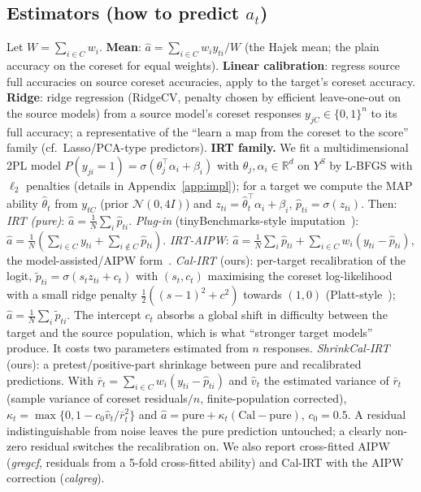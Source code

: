 \subsection{Estimators (how to predict $a_t$)}
Let $W=\sum_{i\in C}w_i$.
\textbf{Mean}: $\hat a=\sum_{i\in C}w_iy_{ti}/W$ (the Hajek mean; the plain accuracy on the coreset for equal weights).
\textbf{Linear calibration}: regress source full accuracies on source coreset accuracies, apply to the target's coreset accuracy.
\textbf{Ridge}: ridge regression (RidgeCV, penalty chosen by efficient leave-one-out on the source models) from a source model's coreset responses $y_{jC}\in\{0,1\}^n$ to its full accuracy; a representative of the ``learn a map from the coreset to the score'' family (cf.\ Lasso/PCA-type predictors).
\textbf{IRT family.} We fit a multidimensional 2PL model $P(y_{ji}=1)=\sigma(\theta_j^\top\alpha_i+\beta_i)$ with $\theta_j,\alpha_i\in\mathbb R^d$ on $Y^S$ by L-BFGS with $\ell_2$ penalties (details in Appendix~\ref{app:impl}); for a target we compute the MAP ability $\hat\theta_t$ from $y_{tC}$ (prior $\mathcal N(0,4I)$) and $z_{ti}=\hat\theta_t^\top\alpha_i+\beta_i$, $\hat p_{ti}=\sigma(z_{ti})$. Then:
\emph{IRT (pure)}: $\hat a=\frac1N\sum_i\hat p_{ti}$.
\emph{Plug-in} (tinyBenchmarks-style imputation~\citep{polo2024tiny}): $\hat a=\frac1N(\sum_{i\in C}y_{ti}+\sum_{i\notin C}\hat p_{ti})$.
\emph{IRT-AIPW}: $\hat a=\frac1N\sum_i\hat p_{ti}+\sum_{i\in C}w_i(y_{ti}-\hat p_{ti})$, the model-assisted/AIPW form~\citep{sarndal1992model,robins1994estimation,angelopoulos2023ppi}.
\emph{Cal-IRT} (ours): per-target recalibration of the logit, $\tilde p_{ti}=\sigma(s_tz_{ti}+c_t)$ with $(s_t,c_t)$ maximising the coreset log-likelihood with a small ridge penalty $\frac12((s-1)^2+c^2)$ towards $(1,0)$ (Platt-style~\citep{platt1999probabilistic}); $\hat a=\frac1N\sum_i\tilde p_{ti}$. The intercept $c_t$ absorbs a global shift in difficulty between the target and the source population, which is what ``stronger target models'' produce. It costs two parameters estimated from $n$ responses.
\emph{ShrinkCal-IRT} (ours): a pretest/positive-part shrinkage between pure and recalibrated predictions. With $\bar r_t=\sum_{i\in C}w_i(y_{ti}-\hat p_{ti})$ and $\hat v_t$ the estimated variance of $\bar r_t$ (sample variance of coreset residuals$/n$, finite-population corrected), $\kappa_t=\max\{0,1-c_0\hat v_t/\bar r_t^{2}\}$ and $\hat a=\mathrm{pure}+\kappa_t(\mathrm{Cal}-\mathrm{pure})$, $c_0=0.5$. A residual indistinguishable from noise leaves the pure prediction untouched; a clearly non-zero residual switches the recalibration on.
We also report cross-fitted AIPW (\emph{gregcf}, residuals from a 5-fold cross-fitted ability) and Cal-IRT with the AIPW correction (\emph{calgreg}).

